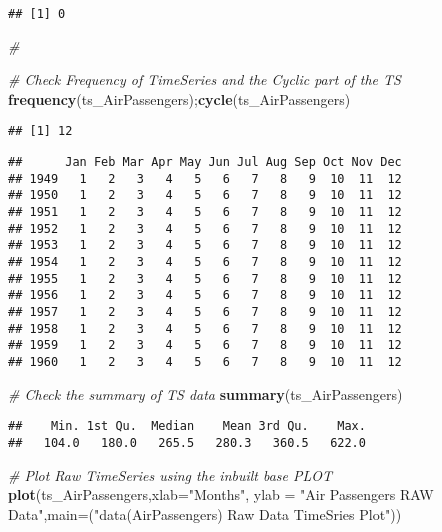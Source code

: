 \documentclass[]{article}
\newenvironment{Shaded}{\begin{snugshade}}{\end{snugshade}}
\newcommand{\CommentTok}[1]{\textcolor[rgb]{0.56,0.35,0.01}{\textit{#1}}}
\newcommand{\DataTypeTok}[1]{\textcolor[rgb]{0.13,0.29,0.53}{#1}}
\newcommand{\KeywordTok}[1]{\textcolor[rgb]{0.13,0.29,0.53}{\textbf{#1}}}
\newcommand{\NormalTok}[1]{#1}
\newcommand{\StringTok}[1]{\textcolor[rgb]{0.31,0.60,0.02}{#1}}
\begin{document}
\begin{verbatim}
## [1] 0
\end{verbatim}

\begin{Shaded}
\begin{Highlighting}[]
\CommentTok{# }
\end{Highlighting}
\end{Shaded}

\begin{Shaded}
\begin{Highlighting}[]
\CommentTok{# Check Frequency of TimeSeries and the Cyclic part of the TS }
\KeywordTok{frequency}\NormalTok{(ts_AirPassengers);}\KeywordTok{cycle}\NormalTok{(ts_AirPassengers)}
\end{Highlighting}
\end{Shaded}

\begin{verbatim}
## [1] 12
\end{verbatim}

\begin{verbatim}
##      Jan Feb Mar Apr May Jun Jul Aug Sep Oct Nov Dec
## 1949   1   2   3   4   5   6   7   8   9  10  11  12
## 1950   1   2   3   4   5   6   7   8   9  10  11  12
## 1951   1   2   3   4   5   6   7   8   9  10  11  12
## 1952   1   2   3   4   5   6   7   8   9  10  11  12
## 1953   1   2   3   4   5   6   7   8   9  10  11  12
## 1954   1   2   3   4   5   6   7   8   9  10  11  12
## 1955   1   2   3   4   5   6   7   8   9  10  11  12
## 1956   1   2   3   4   5   6   7   8   9  10  11  12
## 1957   1   2   3   4   5   6   7   8   9  10  11  12
## 1958   1   2   3   4   5   6   7   8   9  10  11  12
## 1959   1   2   3   4   5   6   7   8   9  10  11  12
## 1960   1   2   3   4   5   6   7   8   9  10  11  12
\end{verbatim}

\begin{Shaded}
\begin{Highlighting}[]
\CommentTok{# Check the summary of TS data }
\KeywordTok{summary}\NormalTok{(ts_AirPassengers)}
\end{Highlighting}
\end{Shaded}

\begin{verbatim}
##    Min. 1st Qu.  Median    Mean 3rd Qu.    Max. 
##   104.0   180.0   265.5   280.3   360.5   622.0
\end{verbatim}

\begin{Shaded}
\begin{Highlighting}[]
\CommentTok{# Plot Raw TimeSeries using the inbuilt base PLOT }
\KeywordTok{plot}\NormalTok{(ts_AirPassengers,}\DataTypeTok{xlab=}\StringTok{"Months"}\NormalTok{, }\DataTypeTok{ylab =} \StringTok{"Air Passengers RAW Data"}\NormalTok{,}\DataTypeTok{main=}\NormalTok{(}\StringTok{"data(AirPassengers) Raw Data TimeSries Plot"}\NormalTok{))}
\end{Highlighting}
\end{Shaded}
\end{document}
